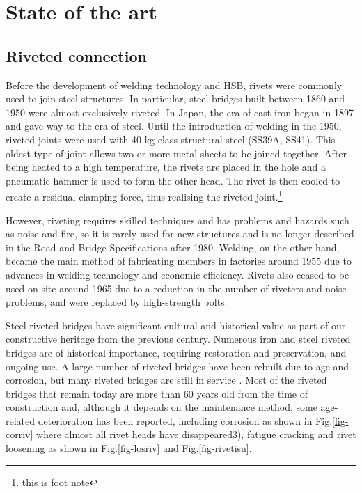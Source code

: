 \chapter{State of the art}
\label{ch2}

\begin{spacing}{1.25} %
\minitoc %
\end{spacing} %
\onehalfspacing %

\section{Riveted connection}

Before the development of welding technology and \ac{HSB}, rivets were commonly used to join steel structures. In particular, steel bridges built between 1860 and 1950 were almost exclusively riveted. In Japan, the era of cast iron began in 1897 and gave way to the era of steel. Until the introduction of welding in the 1950, riveted joints were used with 40 kg class structural steel (SS39A, SS41)\cite{rivet1934}. This oldest type of joint allows two or more metal sheets to be joined together. After being heated to a high temperature, the rivets are placed in the hole and a pneumatic hammer is used to form the other head. The rivet is then cooled to create a residual clamping force, thus realising the riveted joint.\footnote{this is foot note}

However, riveting requires skilled techniques and has problems and hazards such as noise and fire, so it is rarely used for new structures and is no longer described in the Road and Bridge Specifications after 1980. Welding, on the other hand, became the main method of fabricating members in factories around 1955 due to advances in welding technology and economic efficiency. Rivets also ceased to be used on site around 1965 due to a reduction in the number of riveters and noise problems, and were replaced by high-strength bolts.

Steel riveted bridges have significant cultural and historical value as part of our constructive heritage from the previous century. Numerous iron and steel riveted bridges are of historical importance, requiring restoration and preservation, and ongoing use. A large number of riveted bridges have been rebuilt due to age and corrosion, but many riveted bridges are still in service \cite{COLLETTE2014}. Most of the riveted bridges that remain today are more than 60 years old from the time of construction and, although it depends on the maintenance method, some age-related deterioration has been reported, including corrosion as shown in Fig.\ref{fig-corriv} where almost all rivet heads have disappeared3), fatigue cracking and rivet loosening as shown in Fig.\ref{fig-losriv} and Fig.\ref{fig-rivetisu}.


